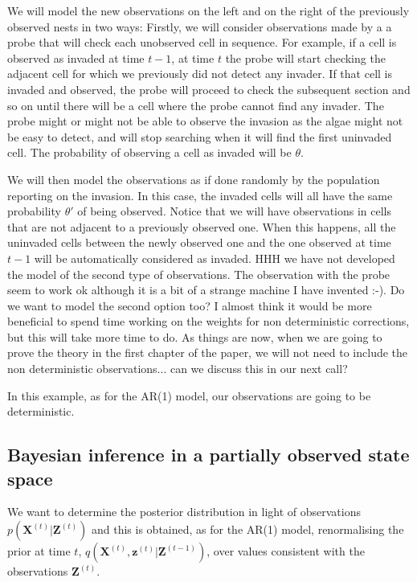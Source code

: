 \documentclass[11pt,a4paper]{article}
\renewcommand{\vec}[1]{\mathbf{#1}}
\begin{document}
We will model the new observations on the left and on the right of the previously observed nests in two ways: Firstly, we will consider observations made by a a probe that will check each unobserved cell in sequence. For example, if a cell is observed as invaded at time $t-1$, at time $t$ the probe will start checking the adjacent cell for which we previously did not detect any invader. If that cell is invaded and observed, the probe will proceed to check the subsequent section and so on until there will be a cell where the probe cannot find any invader. The probe might or might not be able to observe the invasion as the algae might not be easy to detect, and will stop searching when it will find the first uninvaded cell. The probability of observing a cell as invaded will be $\theta$.


We will then model the observations as if done randomly by the population reporting on the invasion. In this case, the invaded cells will all have the same probability $\theta'$ of being observed. Notice that we will have observations in cells that are not adjacent to a previously observed one. When this happens, all the uninvaded cells between the newly observed one and the one observed at time $t-1$ will be automatically considered as invaded. {\color{blue} HHH we have not developed the model of the second type of observations. The observation with the probe seem to work ok although it is a bit of a strange machine I have invented :-). Do we want to model the second option too? I almost think it would be more beneficial to spend time working on the weights for non deterministic corrections, but this will take more time to do. As things are now, when we are going to prove the theory in the first chapter of the paper, we will not need to include the non deterministic observations... can we discuss this in our next call?}

In this example, as for the AR(1) model, our observations are going to be deterministic.

\subsection{Bayesian inference in a partially observed state space}
We want to determine the posterior distribution in light of observations $p(\vec{X}^{(t)} | \vec{Z}^{(t)})$ and this is obtained, as for the AR(1) model, renormalising the prior at time $t$, $q(\vec{X}^{(t)}, \vec{z}^{(t)} | \vec{Z}^{(t-1)})$, over values consistent with the observations $\vec{Z}^{(t)}$.
\end{document}
